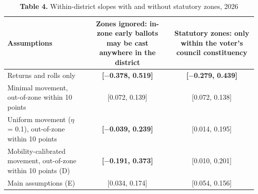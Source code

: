 \begin{table}[!htbp]
\centering
\footnotesize
\setlength{\tabcolsep}{3.5pt}
\caption*{\textbf{Table 4.} Within-district slopes with and without statutory zones, 2026}
\begin{tabularx}{\linewidth}{LCC}
\toprule
Assumptions & Zones ignored: in-zone early ballots may be cast anywhere in the district & Statutory zones: only within the voter's council constituency \\
\midrule
Returns and rolls only & \textbf{[$-$0.378, 0.519]} & \textbf{[$-$0.279, 0.439]} \\
Minimal movement, out-of-zone within 10 points & [0.072, 0.139] & [0.072, 0.138] \\
Uniform movement ($\eta $ = 0.1), out-of-zone within 10 points & \textbf{[$-$0.039, 0.239]} & [0.014, 0.195] \\
Mobility-calibrated movement, out-of-zone within 10 points (D) & \textbf{[$-$0.191, 0.373]} & [0.010, 0.201] \\
Main assumptions (E) & [0.034, 0.174] & [0.054, 0.156] \\
\bottomrule
\end{tabularx}
\par{}
\end{table}
